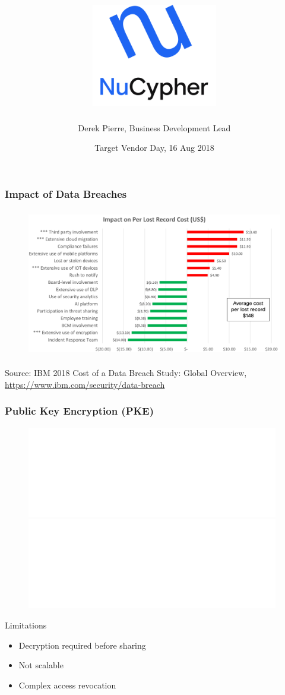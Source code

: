 \documentclass[xetex,mathsans,sans,aspectratio=169]{beamer}
\title[NuCypher]{\includegraphics[width=5.5cm]{pdf/nucypher_logo.pdf}}
\author[Derek]{Derek Pierre, Business Development Lead}
\date[16 Aug 2018]{Target Vendor Day, 16 Aug 2018}
\begin{document}
    \begin{frame}
        \titlepage
    \end{frame}



    \begin{frame}
      \frametitle{Impact of Data Breaches}
        \begin{figure}
            \centering
            \includegraphics[height=6.5cm]{pdf/impact-of-data-breaches.pdf}
        \end{figure}

        {\tiny Source: IBM 2018 Cost of a Data Breach Study: Global Overview, \url{https://www.ibm.com/security/data-breach} \par}
    \end{frame}

    \begin{frame}
        \frametitle{Public Key Encryption (PKE)}
        \begin{figure}
            \centering
            \includegraphics<1>[width=11cm]{pdf/pke-multi.pdf}
            \includegraphics<2>[width=11cm]{pdf/pke-multi-hack.pdf}
        \end{figure}

        Limitations
        \begin{itemize}
            \item Decryption required before sharing
            \item Not scalable
            \item Complex access revocation
        \end{itemize}
    \end{frame}
\end{document}
